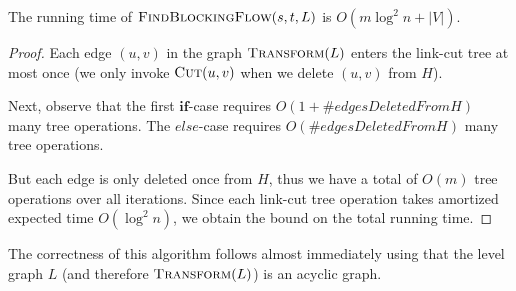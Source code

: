 \begin{claim}
The running time of $\textsc{FindBlockingFlow}(s, t, L)$ is $O(m \log^2 n + |V|)$.
\end{claim}
\begin{proof}
Each edge $(u,v)$ in the graph $\textsc{Transform}(L)$ enters the link-cut tree at most once (we only invoke $\textsc{Cut}(u,v)$ when we delete $(u,v)$ from $H$). 

Next, observe that the first $\mathbf{if}$-case requires $O(1 + \#edgesDeletedFromH)$ many tree operations. The $else$-case requires $O(\#edgesDeletedFromH)$ many tree operations. 

But each edge is only deleted once from $H$, thus we have a total of $O(m)$ tree operations over all iterations. Since each link-cut tree operation takes amortized expected time $O(\log^2 n)$, we obtain the bound on the total running time. 
\end{proof}

The correctness of this algorithm follows almost immediately using that the level graph $L$ (and therefore $\textsc{Transform}(L)$) is an acyclic graph.


